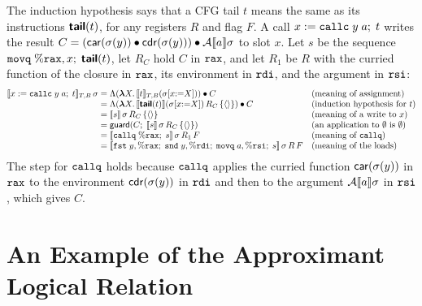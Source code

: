 The induction hypothesis says that a CFG tail $t$ means the same as
its instructions $\textsf{\bfseries tail}(t)$, for any registers $R$ and flag $F$.
A call $x \mathrel{:=} \mathtt{callc}\;y\;a;\; t$ writes the result
$C = (\mathsf{car}(\sigma(y)) \mathbin{\bullet} \mathsf{cdr}(\sigma(y))) \mathbin{\bullet} \mathcal{A}\llbracket a \rrbracket\sigma$ to slot $x$. Let $s$ be
the sequence $\mathtt{movq}\;\%\mathtt{rax}, x;\; \textsf{\bfseries tail}(t)$, let $R_C$
hold $C$ in $\mathtt{rax}$, and let $R_1$ be $R$ with the curried function of the
closure in $\mathtt{rax}$, its environment in $\mathtt{rdi}$, and the argument
in $\mathtt{rsi}$:
{\small
\[
\begin{array}{@{}r@{\;}c@{\;}l@{\quad}l@{}}
  \den{x \mathrel{:=} \kw{callc}\;y\;a;\; t}_{T,B}\,\sigma
    & = & \Lambda(\mlam{X} \den{t}_{T,B}(\sigma[x{:=}X])) \app C & \text{(meaning of assignment)}\\
    & = & \Lambda(\mlam{X} \den{\pass{tail}(t)}(\sigma[x{:=}X])\,R_C\,\{\langle\rangle\}) \app C & \text{(induction hypothesis for $t$)}\\
    & = & \den{s}\,\sigma\,R_C\,\{\langle\rangle\} & \text{(meaning of a write to $x$)}\\
    & = & \mathsf{guard}(C;\; \den{s}\,\sigma\,R_C\,\{\langle\rangle\}) & \text{(an application to $\emptyset$ is $\emptyset$)}\\
    & = & \den{\kw{callq}\;\%\kw{rax};\; s}\,\sigma\,R_1\,F & \text{(meaning of $\kw{callq}$)}\\
    & = & \den{\kw{fst}\;y,\%\kw{rax};\; \kw{snd}\;y,\%\kw{rdi};\; \kw{movq}\;a,\%\kw{rsi};\; s}\,\sigma\,R\,F & \text{(meaning of the loads)}
\end{array}
\]}
The step for $\mathtt{callq}$ holds because $\mathtt{callq}$ applies the curried function
$\mathsf{car}(\sigma(y))$ in $\mathtt{rax}$ to the environment $\mathsf{cdr}(\sigma(y))$ in
$\mathtt{rdi}$ and then to the argument $\mathcal{A}\llbracket a \rrbracket\sigma$ in
$\mathtt{rsi}$, which gives $C$.

\section{An Example of the Approximant Logical Relation}
\label{app:alr-example}

